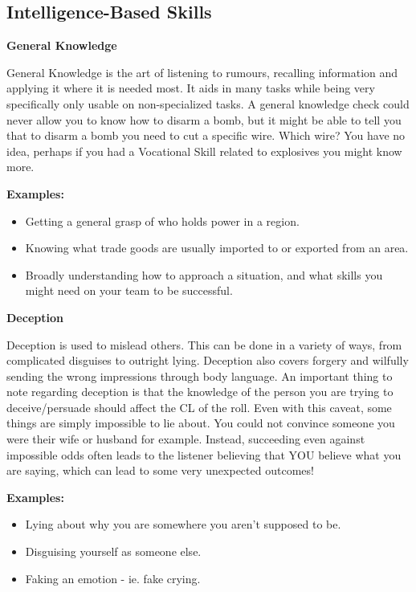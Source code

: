 \subsection{Intelligence-Based Skills}

\textbf{General Knowledge}

General Knowledge is the art of listening to rumours, recalling information and applying it where it is needed most. It aids in many tasks while being very specifically only usable on non-specialized tasks. A general knowledge check could never allow you to know how to disarm a bomb, but it might be able to tell you that to disarm a bomb you need to cut a specific wire. Which wire? You have no idea, perhaps if you had a Vocational Skill related to explosives you might know more.

\begin{displayquote}
    \textbf{Examples:}
    \begin{itemize}
        \item Getting a general grasp of who holds power in a region.
        \item Knowing what trade goods are usually imported to or exported from an area.
        \item Broadly understanding how to approach a situation, and what skills you might need on your team to be successful.
    \end{itemize}
\end{displayquote}

\textbf{Deception}

Deception is used to mislead others. This can be done in a variety of ways, from complicated disguises to outright lying. Deception also covers forgery and wilfully sending the wrong impressions through body language. An important thing to note regarding deception is that the knowledge of the person you are trying to deceive/persuade should affect the CL of the roll. Even with this caveat, some things are simply impossible to lie about. You could not convince someone you were their wife or husband for example. Instead, succeeding even against impossible odds often leads to the listener believing that YOU believe what you are saying, which can lead to some very unexpected outcomes!

\begin{displayquote}
    \textbf{Examples:}
    \begin{itemize}
        \item Lying about why you are somewhere you aren't supposed to be.
        \item Disguising yourself as someone else.
        \item Faking an emotion - ie. fake crying.
    \end{itemize}
\end{displayquote}

